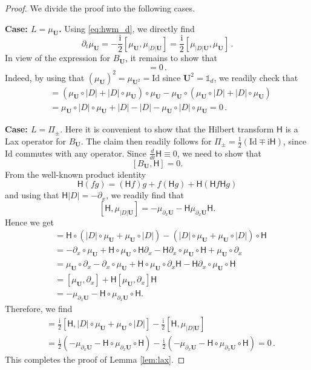 \documentclass[11pt,reqno]{amsart}
\theoremstyle{definition}
\theoremstyle{remark}
\theoremstyle{remark}
\numberwithin{equation}{section}
\newcommand{\pt}{\partial}
\newcommand{\be}{\begin{equation}}
\newcommand{\ee}{\end{equation}}
\newcommand{\ii}{\mathrm{i}}
\newcommand{\Hil}{\mathsf{H}}
\newcommand{\Ub}{\mathbf{U}}
\newcommand{\id}{\mathrm{Id}}
\newcommand{\Ds}{|D|}
\begin{document}
\begin{proof}
We divide the proof into the following cases.

\medskip
\textbf{Case: $L=\mu_\Ub$.} Using \eqref{eq:hwm_d}, we directly find
\be
\pt_t \mu_\Ub = -\frac{\ii}{2} [\mu_\Ub, \mu_ {\Ds \Ub}] = \frac{\ii}{2} [\mu_{\Ds \Ub}, \mu_\Ub] \, .
\ee 
In view of the expression for $B_\Ub$, it remains to show that
\be
[\mu_\Ub \circ \Ds + \Ds \circ \mu_\Ub, \mu_\Ub]  = 0 \, .
\ee
Indeed, by using that $(\mu_\Ub)^2 = \mu_{\Ub^2} = \id$ since $\Ub^2= \mathds{1}_d$, we readily check that
\begin{align*}
[\mu_\Ub \circ  \Ds + \Ds \circ \mu_\Ub, \mu_\Ub] & = (\mu_\Ub \circ \Ds + \Ds \circ \mu_\Ub) \circ \mu_\Ub - \mu_\Ub \circ (\mu_\Ub \circ \Ds + \Ds \circ \mu_\Ub) \\
& =\mu_\Ub \circ \Ds \circ \mu_\Ub + \Ds - \Ds - \mu_\Ub \circ  \Ds \circ \mu_\Ub = 0 \, .
\end{align*}

\medskip
\textbf{Case: $L=\Pi_{\pm}$}. Here it is convenient to show that the Hilbert transform $\Hil$ is a Lax operator for $B_\Ub$. The claim then readily follows for $\Pi_{\pm}=\frac 1 2 (\id  \mp \ii \Hil)$, since $\id$ commutes with any operator. Since $\frac{d}{dt} \Hil \equiv 0$, we need to show that
$$
[B_\Ub,\Hil] = 0.
$$
From the well-known product identity 
$$
\Hil(fg) = (\Hil f) g + f (\Hil g) + \Hil(\Hil f \Hil g) 
$$ 
and using that $\Hil \Ds=-\pt_x$, we readily find that
$$
[\Hil,\mu_{\Ds \Ub}] = -\mu_{\pt_x \Ub} - \Hil \mu_{\pt_x \Ub} \Hil.
$$
Hence we get
\begin{align*}
[\Hil, \Ds \circ \mu_\Ub + \mu_\Ub \circ \Ds ] & = \Hil \circ ( \Ds \circ \mu_\Ub + \mu_\Ub \circ  \Ds ) - (\Ds \circ \mu_\Ub + \mu_\Ub \circ \Ds) \circ \Hil \\
& = -\pt_x \circ \mu_\Ub + \Hil \circ \mu_\Ub \circ \Hil \pt_x - \Hil \pt_x \circ  \mu_\Ub \circ \Hil + \mu_\Ub \circ \pt_x \\
& = \mu_\Ub \circ \pt_x - \pt_x \circ \mu_\Ub + \Hil  \circ \mu_\Ub \circ \pt_x \Hil - \Hil \pt_x \circ  \mu_\Ub \circ \Hil \\
& = [\mu_\Ub,\pt_x] + \Hil [\mu_\Ub,\pt_x] \Hil \\
& = -\mu_{\pt_x \Ub} - \Hil \circ  \mu_{\pt_x \Ub} \circ \Hil.
\end{align*}
Therefore, we find
\begin{align*}
[\Hil,B_\Ub] & = \frac{\ii}{2} [\Hil, \Ds \circ \mu_\Ub + \mu_\Ub \circ \Ds ] - \frac{\ii}{2} [\Hil, \mu_{\Ds \Ub}] \\
& = \frac{\ii}{2} (-\mu_{\pt_x \Ub} - \Hil  \circ \mu_{\pt_x \Ub} \circ \Hil ) - \frac{\ii}{2} ( -\mu_{\pt_x \Ub} - \Hil \circ \mu_{\pt_x \Ub} \circ \Hil ) = 0 \, .
\end{align*}
This completes the proof of Lemma \ref{lem:lax}.
\end{proof}
\end{document}
